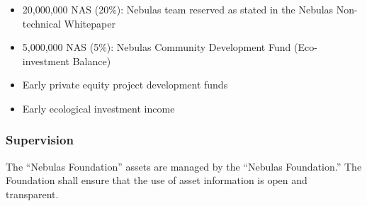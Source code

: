 \begin{itemize}
	\item 20,000,000 NAS (20\%): Nebulas team reserved as stated in the Nebulas Non-technical Whitepaper
    \item 5,000,000 NAS (5\%): Nebulas Community Development Fund (Eco-investment Balance)
	\item Early private equity project development funds
	\item Early ecological investment income
\end{itemize}

\subsubsection{Supervision}

The “Nebulas Foundation” assets are managed by the “Nebulas Foundation.” The Foundation shall ensure that the use of asset information is open and transparent.
